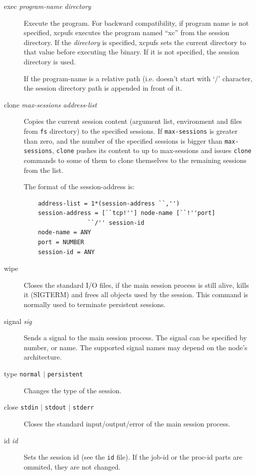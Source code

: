 \documentclass[11pt]{p9article}
\begin{document}
\begin{description}

\item[exec {\sl program-name} {\sl directory} ] Execute the program. For
backward compatibility, if program name is not specified, xcpufs executes
the program named ``xc'' from the session directory. If the {\sl directory}
is specified, xcpufs sets the current directory to that value before
executing the binary. If it is not specified, the session directory is used.

If the program-name is a relative path (i.e. doesn't start with `/'
character, the session directory path is appended in front of it.

\item[clone {\sl max-sessions address-list}] Copies the current session content
(argument list, environment and files from \verb|fs| directory) to the
specified sessions. If \verb|max-sessions| is greater than zero, and the
number of the specified sessions is bigger than \verb|max-sessions|,
\verb|clone| pushes its content to up to max-sessions and issues
\verb|clone| commands to some of them to clone themselves to the remaining
sessions from the list.

The format of the session-address is:

\begin{verbatim}
	address-list = 1*(session-address ``,'')
	session-address = [``tcp!''] node-name [``!''port] 
		          ``/'' session-id
	node-name = ANY
	port = NUMBER
	session-id = ANY
\end{verbatim}

\item [wipe] Closes the standard I/O files, if the main session process is
still alive, kills it (SIGTERM) and frees all objects used by the session.
This command is normally used to terminate persistent sessions. 

\item [signal {\sl sig}] Sends a signal to the main session process. The
signal can be specified by number, or name. The supported signal names may
depend on the node's architecture.

\item [type {\tt normal} $|$ {\tt persistent}] Changes the type of the session.

\item [close {\tt stdin} $|$ {\tt stdout} $|$ {\tt stderr}] Closes the
standard input/output/error of the main session process.

\item [id {\sl id}] Sets the session id (see the \verb|id| file). If the
job-id or the proc-id parts are ommited, they are not changed.

\end{description}
\end{document}
